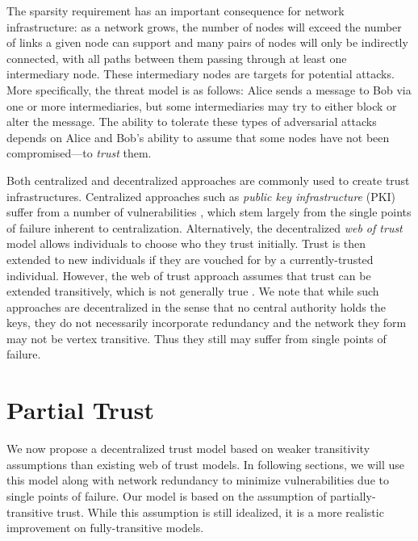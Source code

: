 \documentclass[prodmode,permissions]{acmsmall-ec16}
\begin{document}
The sparsity requirement has an important consequence for network infrastructure:
as a network grows, the number of nodes will exceed the number of links a given
node can support and many pairs of nodes will only be indirectly connected,
with all paths between them passing through at least one intermediary node.
These intermediary nodes are targets for potential attacks.
More specifically, the threat model is as follows: Alice sends a message to
Bob via one or more intermediaries, but some intermediaries may try to
either block or alter the message.
The ability to tolerate these types of adversarial attacks depends on
Alice and Bob's ability to assume that some nodes have not been
compromised---to {\em trust} them.

Both centralized and decentralized approaches are commonly used to create
trust infrastructures.
Centralized approaches such as {\em public key infrastructure} (PKI)
suffer from a number of vulnerabilities
\cite{ellison_ten_2000},
which stem largely from the single points of failure inherent to
centralization.
Alternatively, the decentralized {\em web of trust} model
\cite{zimmermann_official_1995,ferguson_practical_2003}
allows individuals
to choose who they trust initially.
Trust is then extended to new individuals if they are vouched for by a
currently-trusted individual.
However, the web of trust approach assumes that trust can be extended
transitively,
which is not generally true
\cite{christianson_why_1997}.
We note that while such approaches are decentralized in the sense that no central authority holds the keys,
they do not necessarily incorporate redundancy and the network they form may not be vertex transitive. Thus they still may suffer from single
points of failure.

\section{Partial Trust}

We now propose a decentralized trust model based on weaker transitivity
assumptions than existing web of trust models.
In following sections, we will use this model along with network redundancy to minimize vulnerabilities due to single points of failure.
Our model is based on the assumption of partially-transitive trust.
While this assumption is still idealized, it is a more realistic improvement
on fully-transitive models.
\end{document}
